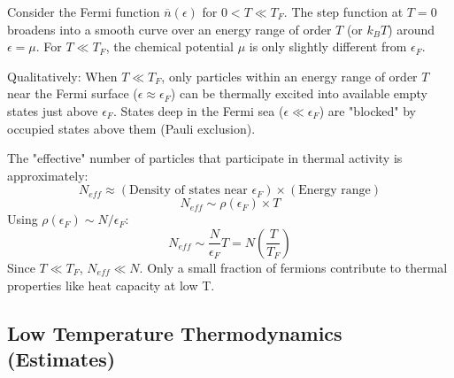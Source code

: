 \documentclass[11pt]{article}
\newcommand{\kb}{k_B} %
\newcommand{\eps}{\epsilon}
\newcommand{\nbar}{\overline{n}} %
\newcommand{\ef}{\epsilon_F} %
\newcommand{\tf}{T_F} %
\begin{document}
Consider the Fermi function $\nbar(\eps)$ for $0 < T \ll \tf$.
The step function at $T=0$ broadens into a smooth curve over an energy range of order $T$ (or $\kb T$) around $\eps = \mu$. For $T \ll \tf$, the chemical potential $\mu$ is only slightly different from $\ef$.

\begin{center}
\end{center}

Qualitatively: When $T \ll \tf$, only particles within an energy range of order $T$ near the Fermi surface ($\eps \approx \ef$) can be thermally excited into available empty states just above $\ef$. States deep in the Fermi sea ($\eps \ll \ef$) are "blocked" by occupied states above them (Pauli exclusion).

The "effective" number of particles that participate in thermal activity is approximately:
\[ N_{eff} \approx (\text{Density of states near } \ef) \times (\text{Energy range}) \]
\[ N_{eff} \sim \rho(\ef) \times T \]
Using $\rho(\ef) \sim N/\ef$:
\[ N_{eff} \sim \frac{N}{\ef} T = N \left( \frac{T}{\tf} \right) \]
Since $T \ll \tf$, $N_{eff} \ll N$. Only a small fraction of fermions contribute to thermal properties like heat capacity at low T.

\subsection*{Low Temperature Thermodynamics (Estimates)}
\end{document}
